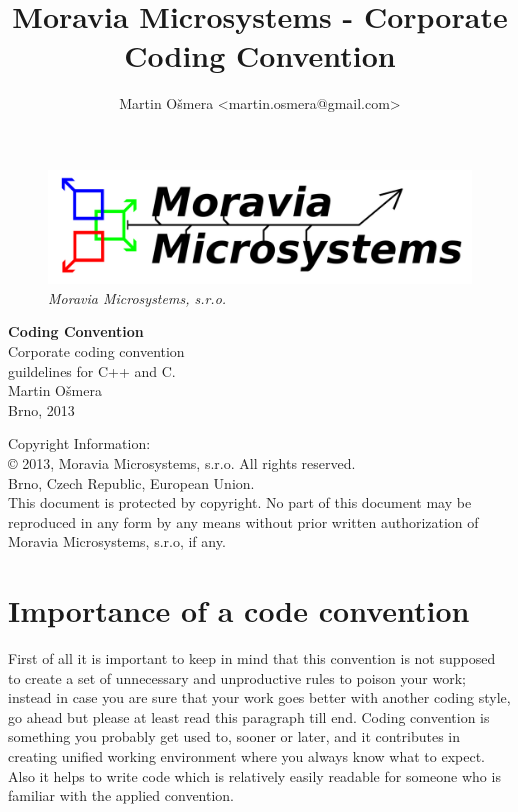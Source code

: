 \documentclass[a4paper,twoside,15pt]{book}
\title{Moravia Microsystems - Corporate Coding Convention}
\author{Martin Ošmera <martin.osmera@gmail.com>}
\begin{document}
\begin{titlepage}
        \begin{figure}[ht!]
                \centering{}
                \includegraphics[width=.9\textwidth]{Moravia_Microsystems.png}
                \caption{\textit{Moravia Microsystems, s.r.o.}}
        \end{figure}
        \begin{center}
                \fontsize{35.83pt}{60pt} \selectfont{}
                \textbf{Coding Convention}
                \\[2cm]
                \fontsize{25pt}{30pt} \selectfont{}
                Corporate coding convention\\
                guildelines for C++ and C.
                \\[1cm]
                \fontsize{15pt}{19pt} \selectfont{}
                Martin Ošmera\\
                Brno, 2013
        \end{center}
\end{titlepage}

Copyright Information:
\\
\copyright{} 2013, Moravia Microsystems, s.r.o. All rights reserved.\\
Brno, Czech Republic, European Union.
\\
This document is protected by copyright. No part of this document may be reproduced in any form by any means
without prior written authorization of Moravia Microsystems, s.r.o, if any.

\tableofcontents

\chapter{Importance of a code convention}
    First of all it is important to keep in mind that this convention is not supposed to create a set of unnecessary and unproductive rules to poison your work; instead in case you are sure that your work goes better with another coding style, go ahead but please at least read this paragraph till end. Coding convention is something you probably get used to, sooner or later, and it contributes in creating unified working environment where you always know what to expect. Also it helps to write code which is relatively easily readable for someone who is familiar with the applied convention.
\end{document}
